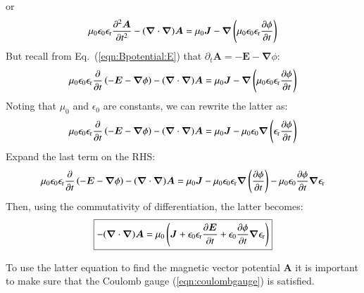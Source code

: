 \documentclass{warpdoc}
\newcommand\frameeqn[1]{\fbox{$\displaystyle #1$}}
\renewcommand{\vec}[1]{\bm{#1}}
\begin{document}
or
%
\begin{equation}
 \mu_0 \epsilon_0 \epsilon_{\rm r} \frac{\partial^2 \vec{A} }{\partial t^2} -   (\vec{\nabla}\cdot\vec{\nabla}) \vec{A}  = \mu_0 \vec{J} - \vec{\nabla}\left(\mu_0\epsilon_0 \epsilon_{\rm r} \frac{\partial \phi}{\partial t}\right)
\end{equation}
% 
But recall from Eq.~(\ref{eqn:Bpotential:E}) that $\partial_t \vec{A} = -\vec{E}-\vec{\nabla}\phi$:
%
\begin{equation}
 \mu_0 \epsilon_0 \epsilon_{\rm r} \frac{\partial }{\partial t}\left( -\vec{E}-\vec{\nabla}\phi \right) -   (\vec{\nabla}\cdot\vec{\nabla}) \vec{A}  = \mu_0 \vec{J} - \vec{\nabla}\left(\mu_0\epsilon_0 \epsilon_{\rm r} \frac{\partial \phi}{\partial t}\right)
\end{equation}
% 
Noting that $\mu_0$ and $\epsilon_0$ are constants, we can rewrite the latter as:
%
\begin{equation}
 \mu_0 \epsilon_0 \epsilon_{\rm r} \frac{\partial }{\partial t}\left( -\vec{E}-\vec{\nabla}\phi \right) -   (\vec{\nabla}\cdot\vec{\nabla}) \vec{A}  = \mu_0 \vec{J} 
 - \mu_0\epsilon_0 \vec{\nabla}\left( \epsilon_{\rm r} \frac{\partial \phi}{\partial t}\right)
\end{equation}
% 
Expand the last term on the RHS:
%
\begin{equation}
 \mu_0 \epsilon_0 \epsilon_{\rm r} \frac{\partial }{\partial t}\left( -\vec{E}-\vec{\nabla}\phi \right) -   (\vec{\nabla}\cdot\vec{\nabla}) \vec{A}  = \mu_0 \vec{J} 
 - \mu_0\epsilon_0 \epsilon_{\rm r} \vec{\nabla}\left(  \frac{\partial \phi}{\partial t}\right)
 - \mu_0\epsilon_0 \frac{\partial \phi}{\partial t} \vec{\nabla}\epsilon_{\rm r}
\end{equation}
% 
Then, using the commutativity of differentiation, the latter becomes:
%
\begin{equation}
\frameeqn{
 -   (\vec{\nabla}\cdot\vec{\nabla}) \vec{A}  = \mu_0 \left(\vec{J} + \epsilon_0 \epsilon_{\rm r} \frac{\partial \vec{E}}{\partial t}  + \epsilon_0 \frac{\partial \phi}{\partial t} \vec{\nabla}\epsilon_{\rm r}\right)
}
\label{eqn:Bpotential:A:Coulomb}
\end{equation}
% 


To use the latter equation to find the magnetic vector potential $\vec{A}$ it is important to make sure that the Coulomb gauge (\ref{eqn:coulombgauge}) is satisfied.
\end{document}
